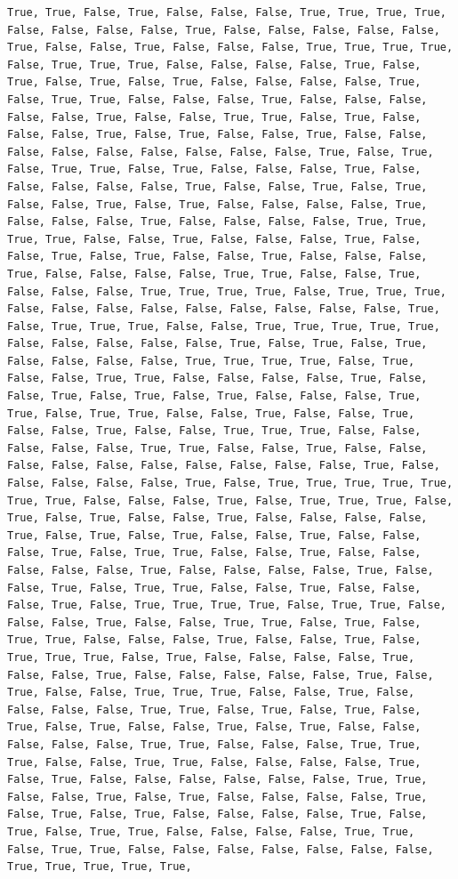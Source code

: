 \documentclass[
  letterpaper,
  DIV=11,
  numbers=noendperiod]{scrartcl}
\begin{document}
\begin{verbatim}
True, True, False, True, False, False, False, True, True, True, True, False, False, False, False, True, False, False, False, False, False, True, False, False, True, False, False, False, True, True, True, True, False, True, True, True, False, False, False, False, True, False, True, False, True, False, True, False, False, False, False, True, False, True, True, False, False, False, True, False, False, False, False, False, True, False, False, True, True, False, True, False, False, False, True, False, True, False, False, True, False, False, False, False, False, False, False, False, False, True, False, True, False, True, True, False, True, False, False, False, True, False, False, False, False, False, True, False, False, True, False, True, False, False, True, False, True, False, False, False, False, True, False, False, False, True, False, False, False, False, True, True, True, True, False, False, True, False, False, False, True, False, False, True, False, True, False, False, True, False, False, False, True, False, False, False, False, True, True, False, False, True, False, False, False, True, True, True, True, False, True, True, True, False, False, False, False, False, False, False, False, False, True, False, True, True, True, False, False, True, True, True, True, True, False, False, False, False, False, True, False, True, False, True, False, False, False, False, True, True, True, True, False, True, False, False, True, True, False, False, False, False, True, False, False, True, False, True, False, True, False, False, False, True, True, False, True, True, False, False, True, False, False, True, False, False, True, False, False, True, True, True, False, False, False, False, False, True, True, False, False, True, False, False, False, False, False, False, False, False, False, False, True, False, False, False, False, False, True, False, True, True, True, True, True, True, True, False, False, False, True, False, True, True, True, False, True, False, True, False, False, True, False, False, False, False, True, False, True, False, True, False, False, True, False, False, False, True, False, True, True, False, False, True, False, False, False, False, False, True, False, False, False, False, True, False, False, True, False, True, True, False, False, True, False, False, False, True, False, True, True, True, True, False, True, True, False, False, False, True, False, False, True, True, False, True, False, True, True, False, False, False, True, False, False, True, False, True, True, True, False, True, False, False, False, False, True, False, False, True, False, False, False, False, False, True, False, True, False, False, True, True, True, False, False, True, False, False, False, False, True, True, False, True, False, True, False, True, False, True, False, False, True, False, True, False, False, False, False, False, True, True, False, False, False, True, True, True, False, False, True, True, False, False, False, False, True, False, True, False, False, False, False, False, False, True, True, False, False, True, False, True, False, False, False, False, True, False, True, False, True, False, False, False, False, True, False, True, False, True, True, False, False, False, False, True, True, False, True, True, False, False, False, False, False, False, False, True, True, True, True, True, 
\end{verbatim}
\end{document}
